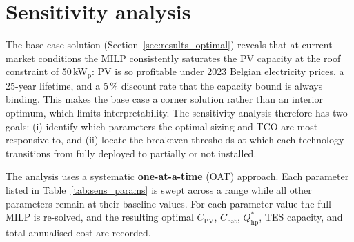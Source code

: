 \documentclass[11pt,a4paper]{report}
\begin{document}
\section{Sensitivity analysis}
\label{sec:results_sensitivity}

The base-case solution (Section~\ref{sec:results_optimal}) reveals that at current
market conditions the MILP consistently saturates the PV capacity at the roof
constraint of 50\,kW$_\mathrm{p}$: PV is so profitable under 2023 Belgian electricity
prices, a 25-year lifetime, and a 5\,\% discount rate that the capacity bound is always
binding.
This makes the base case a corner solution rather than an interior optimum, which
limits interpretability.
The sensitivity analysis therefore has two goals: (i) identify which parameters
the optimal sizing and TCO are most responsive to, and (ii) locate the breakeven
thresholds at which each technology transitions from fully deployed to partially
or not installed.

The analysis uses a systematic \textbf{one-at-a-time} (OAT) approach.
Each parameter listed in Table~\ref{tab:sens_params} is swept across a range
while all other parameters remain at their baseline values.
For each parameter value the full MILP is re-solved, and the resulting optimal
$C_\mathrm{PV}$, $C_\mathrm{bat}$, $Q_\mathrm{hp}^*$, TES capacity, and total
annualised cost are recorded.
\end{document}
